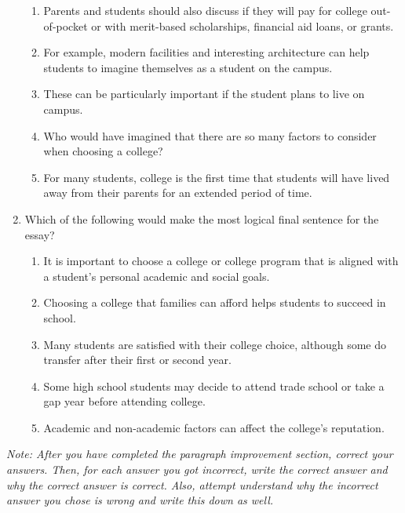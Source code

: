 \begin{enumerate}
\bigskip
\begin{enumerate}[label=(\Alph*)]
\item Parents and students should also discuss if they will pay for college out-of-pocket or with merit-based scholarships, financial aid loans, or grants.
\item For example, modern facilities and interesting architecture can help students to imagine themselves as a student on the campus. 
\item These can be particularly important if the student plans to live on campus. 
\item Who would have imagined that there are so many factors to consider when choosing a college?
\item For many students, college is the first time that students will have lived away from their parents for an extended period of time. 
\end{enumerate}

\bigskip
\item Which of the following would make the most logical final sentence for the essay?

\bigskip
\begin{enumerate}[label=(\Alph*)]
\item It is important to choose a college or college program that is aligned with a student’s personal academic and social goals. 
\item Choosing a college that families can afford helps students to succeed in school.
\item Many students are satisfied with their college choice, although some do transfer after their first or second year.
\item Some high school students may decide to attend trade school or take a gap year before attending college. 
\item Academic and non-academic factors can affect the college's reputation. 
\end{enumerate}
\end{enumerate}

\textit{Note: After you have completed the paragraph improvement section, correct your answers. Then, for each answer you got incorrect, write the correct answer and why the correct answer is correct. Also, attempt understand why the incorrect answer you chose is wrong and write this down as well.}